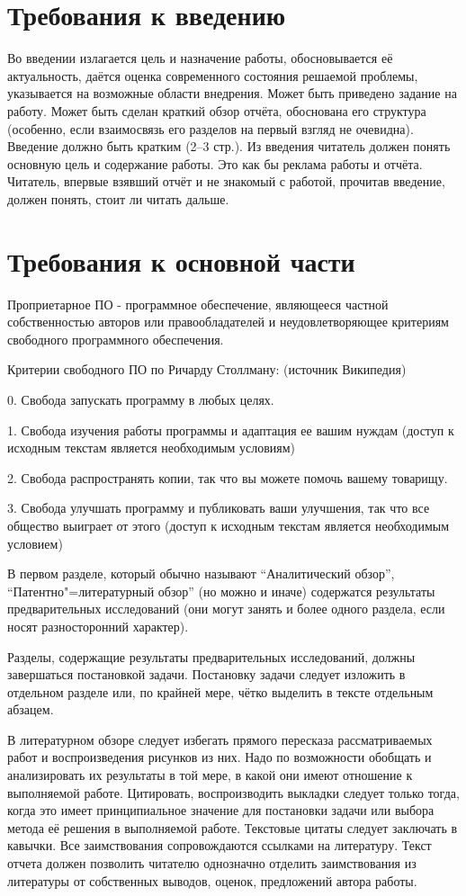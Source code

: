 \documentclass[utf8,14pt, coursreport]{G7-32}
\begin{document}
\section{Требования к введению}

Во введении излагается цель и назначение работы, обосновывается её актуальность, даётся оценка современного состояния решаемой проблемы, указывается на возможные области внедрения. Может быть приведено задание на работу. Может быть сделан краткий обзор отчёта, обоснована его структура (особенно, если взаимосвязь его разделов на первый взгляд не очевидна). Введение должно быть кратким (2--3 стр.). Из введения читатель должен понять основную цель и содержание работы. Это как бы реклама работы и отчёта. Читатель, впервые взявший отчёт и не знакомый с работой, прочитав введение, должен понять, стоит ли читать дальше.

\section{Требования к основной части}

Проприетарное ПО - программное обеспечение, являющееся частной собственностью авторов или правообладателей и неудовлетворяющее критериям свободного программного обеспечения.

Критерии свободного ПО по Ричарду Столлману: (источник Википедия)

0. Свобода запускать программу в любых целях.

1. Свобода изучения работы программы и адаптация ее вашим нуждам (доступ к исходным текстам является необходимым условиям)

2. Свобода распространять копии, так что вы можете помочь вашему товарищу.

3. Свобода улучшать программу и публиковать ваши улучшения, так что все общество выиграет от этого (доступ к исходным текстам является необходимым условием)

В первом разделе, который обычно называют ``Аналитический обзор'', ``Патентно"=литературный обзор'' (но можно и иначе) содержатся результаты предварительных исследований (они могут занять и более одного раздела, если носят разносторонний характер).

Разделы, содержащие результаты предварительных исследований, должны завершаться постановкой задачи. Постановку задачи следует изложить в отдельном разделе или, по крайней мере, чётко выделить в тексте отдельным абзацем.

В литературном обзоре следует избегать прямого пересказа рассматриваемых работ и воспроизведения рисунков из них. Надо по возможности обобщать и анализировать их результаты в той мере, в какой они имеют отношение к выполняемой работе. Цитировать, воспроизводить выкладки следует только тогда, когда это имеет принципиальное значение для постановки задачи или выбора метода её решения в выполняемой работе. Текстовые цитаты следует заключать в кавычки. Все заимствования сопровождаются ссылками на литературу. Текст отчета должен позволить читателю однозначно отделить заимствования из литературы от собственных выводов, оценок, предложений автора работы.
\end{document}
